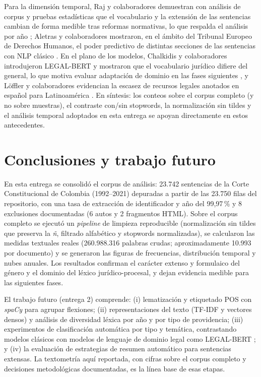 \documentclass[stu,12pt,spanish,floatsintext,natbib]{apa7}
\begin{document}
Para la dimensión temporal, Raj y colaboradores demuestran con análisis
de corpus y pruebas estadísticas que el vocabulario y la extensión de las
sentencias cambian de forma medible tras reformas normativas, lo que
respalda el análisis por año \citep{raj2026collective}; Aletras y
colaboradores mostraron, en el ámbito del Tribunal Europeo de Derechos
Humanos, el poder predictivo de distintas secciones de las sentencias con
NLP clásico \citep{aletras2016predicting}. En el plano de los modelos,
Chalkidis y colaboradores introdujeron LEGAL-BERT y mostraron que el
vocabulario jurídico difiere del general, lo que motiva evaluar adaptación
de dominio en las fases siguientes \citep{chalkidis2020legalbert}, y
Löffler y colaboradores evidencian la escasez de recursos legales anotados
en español para Latinoamérica \citep{loffler2025predicting}. En síntesis:
los conteos sobre el corpus completo (y no sobre muestras), el contraste
con/sin stopwords, la normalización sin tildes y el análisis temporal
adoptados en esta entrega se apoyan directamente en estos antecedentes.

\section{Conclusiones y trabajo futuro}
En esta entrega se consolidó el corpus de análisis: 23.742 sentencias de
la Corte Constitucional de Colombia (1992--2021) depuradas a partir de
las 23.750 filas del repositorio, con una tasa de extracción de
identificador y año del 99,97\,\% y 8 exclusiones documentadas (6 autos y
2 fragmentos HTML). Sobre el corpus completo se ejecutó un
\emph{pipeline} de limpieza reproducible (normalización sin tildes que
preserva la \emph{ñ}, filtrado alfabético y stopwords normalizadas), se
calcularon las medidas textuales reales (260.988.316 palabras crudas;
aproximadamente 10.993 por documento) y se generaron las figuras de
frecuencias, distribución temporal y nubes anuales. Los resultados
confirman el carácter extenso y formulaico del género y el dominio del
léxico jurídico-procesal, y dejan evidencia medible para las siguientes
fases.

El trabajo futuro (entrega 2) comprende: (i) lematización y etiquetado
POS con \emph{spaCy} para agrupar flexiones; (ii) representaciones del
texto (TF-IDF y vectores densos) y análisis de diversidad léxica por año
y por tipo de providencia; (iii) experimentos de clasificación automática
por tipo y temática, contrastando modelos clásicos con modelos de
lenguaje de dominio legal como LEGAL-BERT \citep{chalkidis2020legalbert};
y (iv) la evaluación de estrategias de resumen automático para sentencias
extensas. La textometría aquí reportada, con cifras sobre el corpus
completo y decisiones metodológicas documentadas, es la línea base de
esas etapas.


\end{document}

